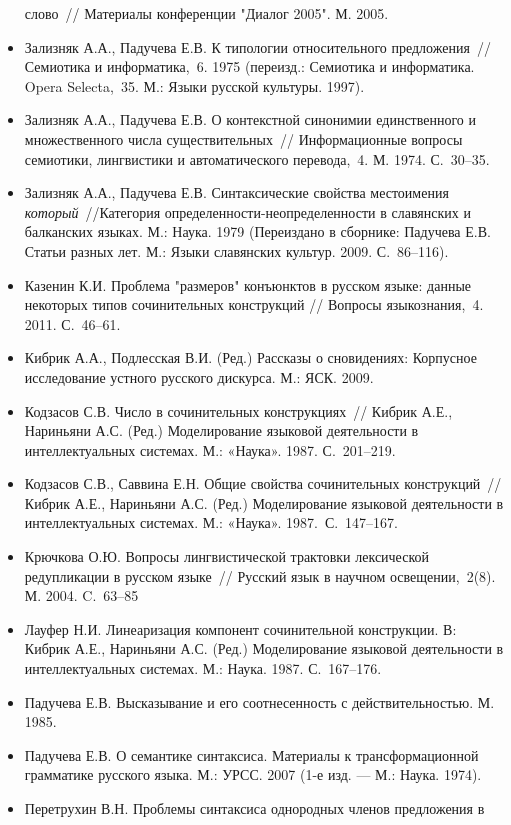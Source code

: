 \begin{itemize}
  слово~// Материалы конференции "Диалог 2005". М. 2005.
\item
  Зализняк А.А., Падучева Е.В. К типологии относительного предложения~//
  Семиотика и информатика,~6. 1975 (переизд.: Семиотика и информатика.
  Opera Selecta,~35. М.: Языки русской культуры. 1997).
\item
  Зализняк А.А., Падучева Е.В. О контекстной синонимии единственного и
  множественного числа существительных~// Информационные вопросы
  семиотики, лингвистики и автоматического перевода,~4. М. 1974.
  С.~30--35.
\item
  Зализняк А.А., Падучева Е.В. Синтаксические свойства местоимения
  \textit{который}~//Категория определенности-неопределенности в
  славянских и балканских языках. М.: Наука. 1979 (Переиздано в
  сборнике: Падучева Е.В. Статьи разных лет. М.: Языки славянских
  культур. 2009. С.~86--116).
\item
  Казенин К.И. Проблема "размеров" конъюнктов в русском языке: данные
  некоторых типов сочинительных конструкций // Вопросы языкознания,~4.
  2011. С.~46--61.
\item
  Кибрик А.А., Подлесская В.И. (Ред.) Рассказы о сновидениях: Корпусное
  исследование устного русского дискурса. М.: ЯСК. 2009.
\item
  Кодзасов С.В. Число в сочинительных конструкциях~// Кибрик А.Е.,
  Нариньяни А.С. (Ред.) Моделирование языковой деятельности в
  интеллектуальных системах. М.: «Наука». 1987. С.~201--219.
\item
  Кодзасов С.В., Саввина Е.Н. Общие свойства сочинительных
  конструкций~// Кибрик А.Е., Нариньяни А.С. (Ред.) Моделирование
  языковой деятельности в интеллектуальных системах. М.: «Наука».
  1987.~С.~147--167.
\item
  Крючкова О.Ю. Вопросы лингвистической трактовки лексической
  редупликации в русском языке~// Русский язык в научном
  освещении,~2(8). М. 2004. C.~63--85
\item
  Лауфер Н.И. Линеаризация компонент сочинительной конструкции. В:
  Кибрик А.Е., Нариньяни А.С. (Ред.) Моделирование языковой деятельности
  в интеллектуальных системах. М.: Наука. 1987. С.~167--176.
\item
  Падучева Е.В. Высказывание и его соотнесенность с действительностью.
  М. 1985.
\item
  Падучева Е.В. О семантике синтаксиса. Материалы к трансформационной
  грамматике русского языка. М.: УРСС. 2007 (1-е изд. --- М.: Наука.
  1974).
\item
  Перетрухин В.Н. Проблемы синтаксиса однородных членов предложения в

\end{itemize}
